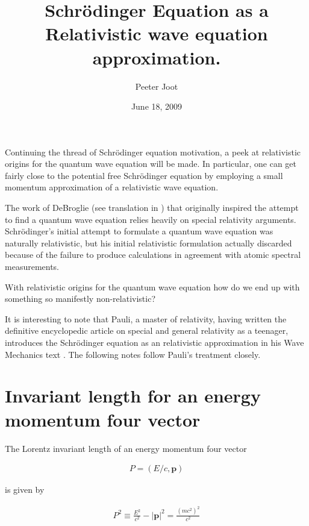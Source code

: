 \documentclass[]{eliblog}
\title{Schr\"{o}dinger Equation as a Relativistic wave equation approximation.}
\author{Peeter Joot}
\date{June 18, 2009}
\newcommand{\Abs}[1]{{\left\lvert{#1}\right\rvert}}
\newcommand{\Bp}[0]{\mathbf{p}}
\begin{document}
\maketitle

Continuing the thread of Schr\"{o}dinger equation motivation, a
peek at relativistic origins for the quantum wave equation will be
made.  In particular, one can get fairly close to the 
potential free Schr\"{o}dinger equation by employing
a small momentum approximation of a relativistic wave equation.

The work of DeBroglie (see translation in \cite{AFkracklauerDeBroglie}) 
that originally inspired the attempt to find a quantum wave equation
relies heavily on special relativity arguments.  
Schr\"{o}dinger's initial attempt to formulate a quantum wave equation
was naturally relativistic, but his initial relativistic formulation 
actually discarded because of the failure to produce calculations in agreement
with atomic spectral measurements.

With relativistic origins for the quantum wave equation how do we end up
with something so manifestly non-relativistic?

It is interesting to note that Pauli, a master of relativity, having
written the definitive encyclopedic article 
\cite{pauli1981tr}
on special and general relativity
as a teenager, introduces the 
Schr\"{o}dinger equation as an relativistic approximation in his
Wave Mechanics text \cite{pauli2000wm}.  The following notes follow Pauli's treatment closely.

\section{Invariant length for an energy momentum four vector}

The Lorentz invariant length of an energy momentum four vector 

\begin{align}
P = (E/c, \Bp)
\end{align}

is given by

\begin{align}\label{eqn:Psquared}
P^2 \equiv \frac{E^2}{c^2} - \Abs{\Bp}^2 = \frac{(m c^2)^2}{c^2}
\end{align}
\end{document}
